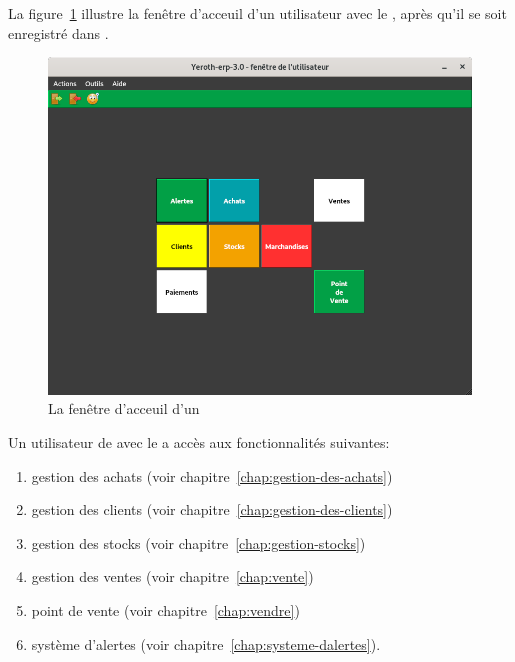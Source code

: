 \label{sec:utilisateurs-vendeur}

La figure~\ref{fig:yeren-fenetre-vendeur} illustre la fen\^etre
d'acceuil d'un utilisateur avec le \role \vendeur, 
apr\`es qu'il se soit enregistr\'e dans \yeren.\\

\begin{figure}[!htbp]
\centering
\includegraphics[scale=0.63]{images/yeroth-fenetre-vendeur.png}
\caption{La fen\^etre d'acceuil d'un \vendeur}
\label{fig:yeren-fenetre-vendeur}
\end{figure}

Un utilisateur de \yeren avec le \role \vendeur a acc\`es
aux fonctionnalit\'es suivantes:

\begin{enumerate}[1)]
	\item gestion des achats (voir chapitre~\ref{chap:gestion-des-achats})
	\item gestion des clients (voir chapitre~\ref{chap:gestion-des-clients})
	\item gestion des stocks (voir chapitre~\ref{chap:gestion-stocks})
	\item gestion des ventes (voir chapitre~\ref{chap:vente})
	\item point de vente (voir chapitre~\ref{chap:vendre})		
	\item syst\`eme d'alertes (voir chapitre~\ref{chap:systeme-dalertes}).\\	
\end{enumerate}
